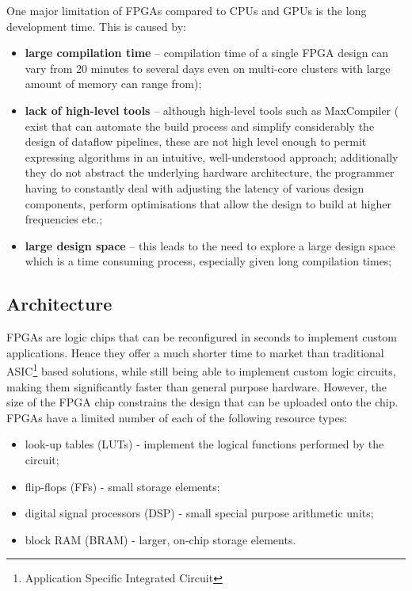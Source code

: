 One major limitation of FPGAs compared to CPUs and GPUs is the long
development time. This is caused by:
\begin{itemize}
\item \textbf{large compilation time} -- compilation time of a single FPGA
  design can vary from 20 minutes to several days even on multi-core
  clusters with large amount of memory can range from);
\item \textbf{lack of high-level tools} -- although high-level tools such
  as MaxCompiler ( exist that can automate
  the build process and simplify considerably the design of dataflow
  pipelines, these are not high level enough to permit expressing
  algorithms in an intuitive, well-understood approach; additionally
  they do not abstract the underlying hardware architecture, the
  programmer having to constantly deal with adjusting the latency of
  various design components, perform optimisations that allow the
  design to build at higher frequencies etc.;
\item \textbf{large design space} -- this leads to the need to explore a
  large design space which is a time consuming process, especially
  given long compilation times;
\end{itemize}

\subsection{Architecture}

FPGAs are logic chips that can be reconfigured in seconds to implement
custom applications. Hence they offer a much shorter time to market
than traditional ASIC\footnote{Application Specific Integrated
  Circuit} based solutions, while still being able to implement custom
logic circuits, making them significantly faster than general purpose
hardware. However, the size of the FPGA chip constrains the design
that can be uploaded onto the chip. FPGAs have a limited number of
each of the following resource types:

\begin{itemize}
\item look-up tables (LUTs) - implement the logical functions performed by the circuit;
\item flip-flops (FFs) - small storage elements;
\item digital signal processors (DSP) - small special purpose arithmetic units;
\item block RAM (BRAM) - larger, on-chip storage elements.
\end{itemize}

